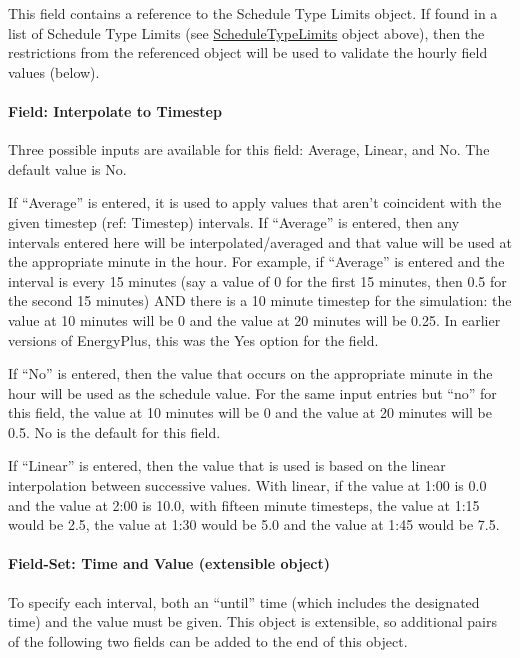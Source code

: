 This field contains a reference to the Schedule Type Limits object. If found in a list of Schedule Type Limits (see \hyperref[scheduletypelimits]{ScheduleTypeLimits} object above), then the restrictions from the referenced object will be used to validate the hourly field values (below).

\paragraph{Field: Interpolate to Timestep}\label{field-interpolate-to-timestep}

Three possible inputs are available for this field: Average, Linear, and No. The default value is No.

If ``Average'' is entered, it is used to apply values that aren't coincident with the given timestep (ref: Timestep) intervals. If ``Average'' is entered, then any intervals entered here will be interpolated/averaged and that value will be used at the appropriate minute in the hour. For example, if ``Average'' is entered and the interval is every 15 minutes (say a value of 0 for the first 15 minutes, then 0.5 for the second 15 minutes) AND there is a 10 minute timestep for the simulation: the value at 10 minutes will be 0 and the value at 20 minutes will be 0.25. In earlier versions of EnergyPlus, this was the Yes option for the field.

If ``No'' is entered, then the value that occurs on the appropriate minute in the hour will be used as the schedule value. For the same input entries but ``no'' for this field, the value at 10 minutes will be 0 and the value at 20 minutes will be 0.5. No is the default for this field.

If ``Linear'' is entered, then the value that is used is based on the linear interpolation between successive values. With linear, if the value at 1:00 is 0.0 and the value at 2:00 is 10.0, with fifteen minute timesteps, the value at 1:15 would be 2.5, the value at 1:30 would be 5.0 and the value at 1:45 would be 7.5.

\paragraph{Field-Set: Time and Value (extensible object)}\label{field-set-time-and-value-extensible-object}

To specify each interval, both an ``until'' time (which includes the designated time) and the value must be given.  This object is extensible, so additional pairs of the following two fields can be added to the end of this object.

